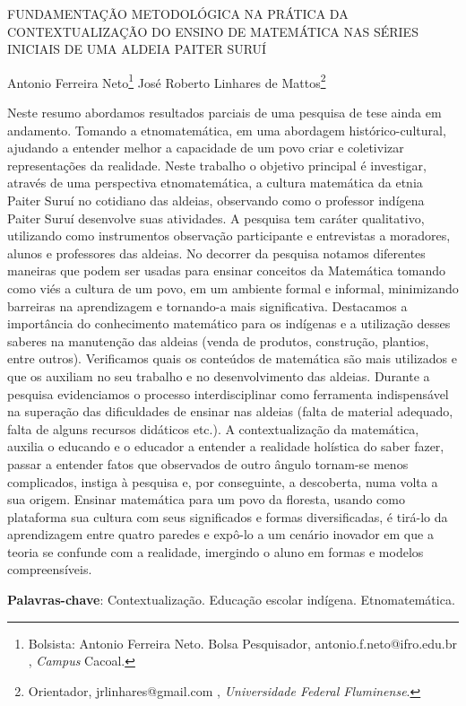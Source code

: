 \documentclass[article,12pt,onesidea,4paper,english,brazil]{abntex2}
\begin{document}
	
	
	\frenchspacing 
	
	\begin{center}
		\LARGE FUNDAMENTAÇÃO METODOLÓGICA NA PRÁTICA DA CONTEXTUALIZAÇÃO
		DO ENSINO DE MATEMÁTICA NAS SÉRIES INICIAIS DE UMA ALDEIA PAITER
		SURUÍ
		
		\normalsize
		Antonio Ferreira Neto\footnote{Bolsista: Antonio Ferreira Neto. Bolsa Pesquisador, antonio.f.neto@ifro.edu.br , \textit{Campus} Cacoal.} 
		José Roberto Linhares de Mattos\footnote{Orientador, jrlinhares@gmail.com , \textit{Universidade Federal Fluminense}.} 
	\end{center}
	
	\noindent Neste resumo abordamos resultados parciais de uma pesquisa de tese ainda em
	andamento. Tomando a etnomatemática, em uma abordagem histórico-cultural,
	ajudando a entender melhor a capacidade de um povo criar e coletivizar
	representações da realidade. Neste trabalho o objetivo principal é investigar, através
	de uma perspectiva etnomatemática, a cultura matemática da etnia Paiter Suruí no
	cotidiano das aldeias, observando como o professor indígena Paiter Suruí
	desenvolve suas atividades. A pesquisa tem caráter qualitativo, utilizando como
	instrumentos observação participante e entrevistas a moradores, alunos e
	professores das aldeias. No decorrer da pesquisa notamos diferentes maneiras que
	podem ser usadas para ensinar conceitos da Matemática tomando como viés a
	cultura de um povo, em um ambiente formal e informal, minimizando barreiras na
	aprendizagem e tornando-a mais significativa. Destacamos a importância do
	conhecimento matemático para os indígenas e a utilização desses saberes na
	manutenção das aldeias (venda de produtos, construção, plantios, entre outros).
	Verificamos quais os conteúdos de matemática são mais utilizados e que os auxiliam
	no seu trabalho e no desenvolvimento das aldeias. Durante a pesquisa
	evidenciamos o processo interdisciplinar como ferramenta indispensável na
	superação das dificuldades de ensinar nas aldeias (falta de material adequado, falta
	de alguns recursos didáticos etc.). A contextualização da matemática, auxilia o
	educando e o educador a entender a realidade holística do saber fazer, passar a
	entender fatos que observados de outro ângulo tornam-se menos complicados,
	instiga à pesquisa e, por conseguinte, a descoberta, numa volta a sua origem.
	Ensinar matemática para um povo da floresta, usando como plataforma sua cultura
	com seus significados e formas diversificadas, é tirá-lo da aprendizagem entre
	quatro paredes e expô-lo a um cenário inovador em que a teoria se confunde com a
	realidade, imergindo o aluno em formas e modelos compreensíveis.
	
	\vspace{\onelineskip}
	
	\noindent
	\textbf{Palavras-chave}: Contextualização. Educação escolar indígena. Etnomatemática.
	
\end{document}
